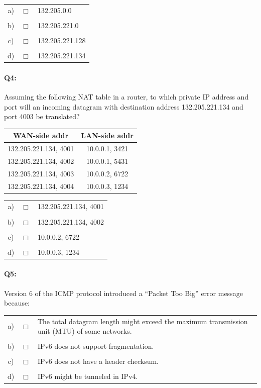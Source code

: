 \documentclass{llncs}
\begin{document}
\begin{tabular}{ccl}
  a) & $\Box$ & 132.205.0.0\\
  \\
  b) & $\Box$ & 132.205.221.0\\
  \\
  c) & $\Box$ & 132.205.221.128\\
  \\
  d) & $\Box$ & 132.205.221.134\\
\end{tabular}


\newpage
\vfill
\paragraph{\textbf{Q4:}}
Assuming the following NAT table in a router, to which private IP address and port will an incoming datagram with destination address 132.205.221.134 and port 4003 be translated?

\begin{center}
\begin{tabular}{c|c}
  WAN-side addr & LAN-side addr \\
  \hline
  132.205.221.134, 4001 & 10.0.0.1, 3421 \\
  132.205.221.134, 4002 & 10.0.0.1, 5431 \\
  132.205.221.134, 4003 & 10.0.0.2, 6722 \\
  132.205.221.134, 4004 & 10.0.0.3, 1234
\end{tabular}
\end{center}

\begin{tabular}{ccl}
  a) & $\Box$ &  132.205.221.134, 4001\\
  \\
  b) & $\Box$ &  132.205.221.134, 4002\\
  \\
  c) & $\Box$ &  10.0.0.2, 6722\\
  \\
  d) & $\Box$ &  10.0.0.3, 1234\\
\end{tabular}

\vfill
\paragraph{\textbf{Q5:}}
Version 6 of the ICMP protocol introduced a ``Packet Too Big'' error message because:

\begin{tabular}{ccl}
  a) & $\Box$ & The total datagram length might exceed the maximum transmission unit (MTU) of some networks.\\
  \\
  b) & $\Box$ & IPv6 does not support fragmentation.\\
  \\
  c) & $\Box$ & IPv6 does not have a header checksum.\\
  \\
  d) & $\Box$ & IPv6 might be tunneled in IPv4.\\
\end{tabular}
\vfill
\end{document}
